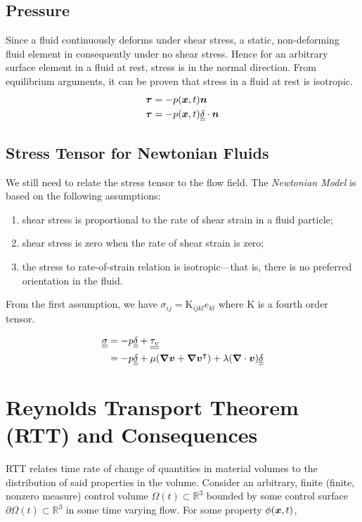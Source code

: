 \subsection{Pressure}
Since a fluid continuously deforms under shear stress, a static, non-deforming fluid element in consequently under no shear stress. Hence for an arbitrary surface element in a fluid at rest, stress is in the normal direction. From equilibrium arguments, it can be proven that stress in a fluid at rest is isotropic.
\begin{equation}
\begin{split}
    \boldsymbol{\tau} &= -p(\boldsymbol{x},t)\boldsymbol{n} \\
    \boldsymbol{\tau} &= -p(\boldsymbol{x},t)\underline{\underline{\delta}}\cdot\boldsymbol{n}
\end{split}
\end{equation}
\subsection{Stress Tensor for Newtonian Fluids}
We still need to relate the stress tensor to the flow field. The \textit{Newtonian Model} is based on the following assumptions:
\begin{enumerate}
    \item shear stress is proportional to the rate of shear strain in a fluid particle;
    \item shear stress is zero when the rate of shear strain is zero;
    \item the stress to rate-of-strain relation is isotropic—that is, there is no preferred orientation in the fluid.
\end{enumerate}
From the first assumption, we have $\sigma_{ij}=\mathrm{K}_{ijkl}e_{kl}$ where $\mathrm{K}$ is a fourth order tensor.

\begin{equation}
\begin{split}
\underline{\underline{\sigma}}&= -p\underline{\underline{\delta}}+\underline{\underline{\tau_v}} \\
&= -p\underline{\underline{\delta}} + \mu(\boldsymbol{\nabla}\boldsymbol{v}+\boldsymbol{\nabla}\boldsymbol{v}^\intercal) + \lambda(\boldsymbol{\nabla}\cdot\boldsymbol{v})\underline{\underline{\delta}}
\end{split}
\end{equation}
\section{Reynolds Transport Theorem (RTT) and Consequences}
RTT relates time rate of change of quantities in material volumes to the distribution of said properties in the volume. Consider an arbitrary, finite (finite, nonzero measure) control volume $\Omega(t)\subset\mathbb{R}^3$ bounded by some control surface $\partial\Omega(t)\subset\mathbb{R}^3$ in some time varying flow.
For some property $\phi(\boldsymbol{x},t)$,

